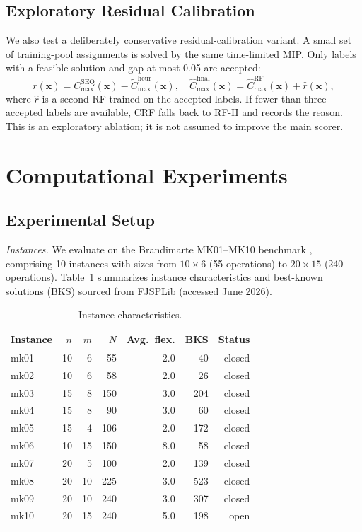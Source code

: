 \documentclass[12pt]{article}
\begin{document}
\subsection{Exploratory Residual Calibration}
We also test a deliberately conservative residual-calibration variant. A small set of training-pool assignments is solved by the same time-limited MIP. Only labels with a feasible solution and gap at most 0.05 are accepted:
\begin{equation}
r(\mathbf{x}) = C_{\max}^{\operatorname{SEQ}}(\mathbf{x}) - \tilde{C}_{\max}^{\text{heur}}(\mathbf{x}),\quad
\hat{C}_{\max}^{\text{final}}(\mathbf{x}) = \hat{C}_{\max}^{\text{RF}}(\mathbf{x}) + \hat{r}(\mathbf{x}),
\end{equation}
where $\hat{r}$ is a second RF trained on the accepted labels. If fewer than three accepted labels are available, CRF falls back to RF-H and records the reason. This is an exploratory ablation; it is not assumed to improve the main scorer.

\section{Computational Experiments}

\subsection{Experimental Setup}
\textit{Instances.} We evaluate on the Brandimarte MK01--MK10 benchmark \citep{Brandimarte1993}, comprising 10 instances with sizes from $10\times6$ (55 operations) to $20\times15$ (240 operations). Table~\ref{tab:instances} summarizes instance characteristics and best-known solutions (BKS) sourced from FJSPLib (accessed June 2026).

\begin{table}[htbp]\centering\caption{Instance characteristics.}\label{tab:instances}
\begin{tabular}{lrrrrrr}\toprule
Instance & $n$ & $m$ & $N$ & Avg.\ flex. & BKS & Status \\ \midrule
mk01 & 10 & 6  & 55 & 2.0 & 40 & closed \\
mk02 & 10 & 6  & 58 & 2.0 & 26 & closed \\
mk03 & 15 & 8  & 150 & 3.0 & 204 & closed \\
mk04 & 15 & 8  & 90 & 3.0 & 60 & closed \\
mk05 & 15 & 4  & 106 & 2.0 & 172 & closed \\
mk06 & 10 & 15 & 150 & 8.0 & 58 & closed \\
mk07 & 20 & 5  & 100 & 2.0 & 139 & closed \\
mk08 & 20 & 10 & 225 & 3.0 & 523 & closed \\
mk09 & 20 & 10 & 240 & 3.0 & 307 & closed \\
mk10 & 20 & 15 & 240 & 5.0 & 198 & open \\ \bottomrule
\end{tabular}
\end{table}
\end{document}

